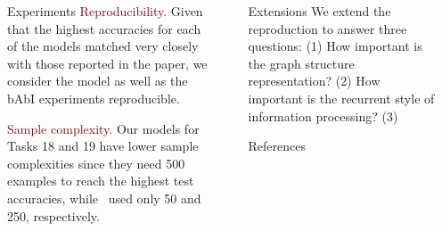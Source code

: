 \documentclass[final,hyperref={pdfpagelabels=false}]{beamer}
\newcommand{\shrink}{-15pt}
\begin{document}
\begin{frame}[t]
\begin{columns}[t]
\begin{column}{.3\textwidth}
\begin{block}{Experiments}
        \textcolor{darkred}{Reproducibility.} Given that the highest accuracies for each of the models matched very closely with those reported in the paper, we consider the model as well as the bAbI experiments reproducible.
        
        \textcolor{darkred}{Sample complexity.} Our models for Tasks 18 and 19 have lower sample complexities since they need 500 examples to reach the highest test accuracies, while~\cite{DBLP:journals/corr/LiTBZ15} used only 50 and 250, respectively.

    \end{block}
    

  \end{column} %


  \begin{column}{.02\textwidth}\end{column} %
    
  \begin{column}{.3\textwidth} %
  
  \vspace{\shrink}
    
    \begin{block}{Extensions}
    We extend the reproduction to answer three questions: (1) How important is the graph structure representation? (2) How important is the recurrent style of information processing? (3)
    \end{block}
    
    

    \begin{block}{References}
      \linespread{0.928}\selectfont
      \footnotesize{
      }
    \end{block}
    
    

  \end{column} %

  \begin{column}{.02\textwidth}\end{column} %

\end{columns} %

\end{frame} %
\end{document}

